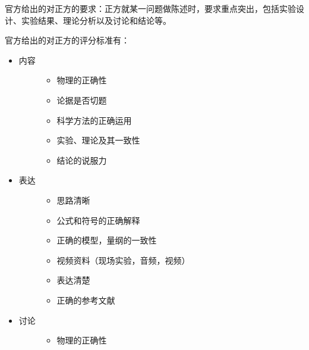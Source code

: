 \documentclass[a4paper,10pt,english]{sphinxmanual}
\begin{document}
官方给出的对正方的要求：正方就某一问题做陈述时，要求重点突出，包括实验设计、实验结果、理论分析以及讨论和结论等。

官方给出的对正方的评分标准有：
\begin{itemize}
\item {} \begin{description}
\item[{内容}] \leavevmode\begin{itemize}
\item {} 
物理的正确性

\item {} 
论据是否切题

\item {} 
科学方法的正确运用

\item {} 
实验、理论及其一致性

\item {} 
结论的说服力

\end{itemize}

\end{description}

\item {} \begin{description}
\item[{表达}] \leavevmode\begin{itemize}
\item {} 
思路清晰

\item {} 
公式和符号的正确解释

\item {} 
正确的模型，量纲的一致性

\item {} 
视频资料（现场实验，音频，视频）

\item {} 
表达清楚

\item {} 
正确的参考文献

\end{itemize}

\end{description}

\item {} \begin{description}
\item[{讨论}] \leavevmode\begin{itemize}
\item {} 
物理的正确性


\end{itemize}
\end{description}
\end{itemize}
\end{document}
